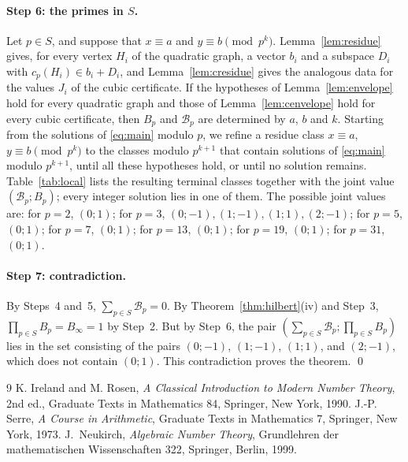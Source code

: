 \documentclass[11pt]{article}
\begin{document}
\paragraph{Step 6: the primes in $S$.} Let $p\in S$, and suppose that $x\equiv a$ and $y\equiv b\pmod{p^k}$. Lemma~\ref{lem:residue} gives, for every vertex $H_i$ of the quadratic graph, a vector $b_i$ and a subspace $D_i$ with $c_p(H_i)\in b_i+D_i$, and Lemma~\ref{lem:cresidue} gives the analogous data for the values $J_i$ of the cubic certificate. If the hypotheses of Lemma~\ref{lem:envelope} hold for every quadratic graph and those of Lemma~\ref{lem:cenvelope} hold for every cubic certificate, then $B_p$ and $\mathcal B_p$ are determined by $a$, $b$ and $k$. Starting from the solutions of \eqref{eq:main} modulo $p$, we refine a residue class $x\equiv a$, $y\equiv b\pmod{p^k}$ to the classes modulo $p^{k+1}$ that contain solutions of \eqref{eq:main} modulo $p^{k+1}$, until all these hypotheses hold, or until no solution remains. Table~\ref{tab:local} lists the resulting terminal classes together with the joint value $(\mathcal B_p;B_p)$; every integer solution lies in one of them. The possible joint values are: for $p=2$, $(0;1)$; for $p=3$, $(0;-1),\allowbreak (1;-1),\allowbreak (1;1),\allowbreak (2;-1)$; for $p=5$, $(0;1)$; for $p=7$, $(0;1)$; for $p=13$, $(0;1)$; for $p=19$, $(0;1)$; for $p=31$, $(0;1)$.

\paragraph{Step 7: contradiction.} By Steps~4 and~5, $\sum_{p\in S}\mathcal B_p=0$. By Theorem~\ref{thm:hilbert}(iv) and Step~3, $\prod_{p\in S}B_p=B_\infty=1$ by Step~2. But by Step~6, the pair $(\textstyle\sum_{p\in S}\mathcal B_p;\prod_{p\in S}B_p)$ lies in the set consisting of the pairs $(0;-1)$, $(1;-1)$, $(1;1)$, and $(2;-1)$, which does not contain $(0;1)$. This contradiction proves the theorem.
\qed

\begin{thebibliography}{9}
 K. Ireland and M. Rosen, \emph{A Classical Introduction to Modern Number Theory}, 2nd ed., Graduate Texts in Mathematics 84, Springer, New York, 1990.
 J.-P. Serre, \emph{A Course in Arithmetic}, Graduate Texts in Mathematics 7, Springer, New York, 1973.
 J.~Neukirch, \emph{Algebraic Number Theory}, Grundlehren der mathematischen Wissenschaften 322, Springer, Berlin, 1999.
\end{thebibliography}
\end{document}
